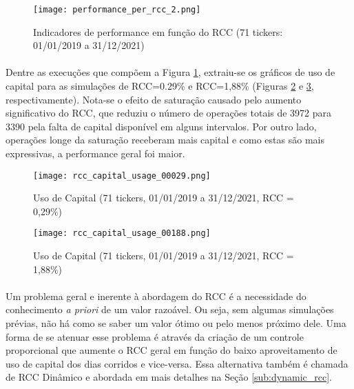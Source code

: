 \begin{figure}[!htb]
    \texttt{[image: performance\_per\_rcc\_2.png]}
    \centering
    \caption{Indicadores de performance em função do RCC (71 tickers: 01/01/2019 a 31/12/2021)}
    \label{fig:550}
\end{figure}

\paragraph{} Dentre as execuções que compõem a Figura \ref{fig:550}, extraiu-se os gráficos de uso de capital para as simulações de RCC=0.29\% e RCC=1,88\% (Figuras \ref{fig:551} e \ref{fig:552}, respectivamente). Nota-se o efeito de saturação causado pelo aumento significativo do RCC, que reduziu o número de operações totais de 3972 para 3390 pela falta de capital disponível em alguns intervalos. Por outro lado, operações longe da saturação receberam mais capital e como estas são mais expressivas, a performance geral foi maior.



\begin{figure}[!htb] %
    \texttt{[image: rcc\_capital\_usage\_00029.png]}
    \centering
    \caption{Uso de Capital (71 tickers, 01/01/2019 a 31/12/2021, RCC = 0,29\%)}
    \label{fig:551}
\end{figure}

\begin{figure}[!htb] %
    \texttt{[image: rcc\_capital\_usage\_00188.png]}
    \centering
    \caption{Uso de Capital (71 tickers, 01/01/2019 a 31/12/2021, RCC = 1,88\%)}
    \label{fig:552}
\end{figure}

\paragraph{} Um problema geral e inerente à abordagem do RCC é a necessidade do conhecimento \textit{a priori} de um valor razoável. Ou seja, sem algumas simulações prévias, não há como se saber um valor ótimo ou pelo menos próximo dele. Uma forma de se atenuar esse problema é através da criação de um controle proporcional que aumente o RCC geral em função do baixo aproveitamento de uso de capital dos dias corridos e vice-versa. Essa alternativa também é chamada de RCC Dinâmico e abordada em mais detalhes na Seção \ref{sub:dynamic_rcc}.

